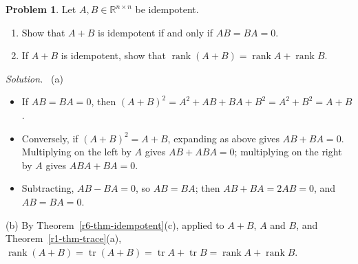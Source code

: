 \documentclass[12pt]{article}
\newcommand{\R}{\mathbb R}
\DeclareMathOperator{\tr}{tr}
\DeclareMathOperator{\rank}{rank}
\theoremstyle{definition}
\newtheorem{problem}{Problem}
\newenvironment{solution}{\par\noindent\textit{Solution.}\ }{\par\smallskip}
\begin{document}
\begin{problem}\label{r6-ex-idempotent-sum}
Let \(A,B\in\R^{n\times n}\) be idempotent.
\begin{enumerate}
\item Show that \(A+B\) is idempotent if and only if \(AB=BA=0\).
\item If \(A+B\) is idempotent, show that \(\rank(A+B)=\rank A+\rank B\).
\end{enumerate}
\end{problem}
\begin{solution}
(a)
\begin{itemize}
\item If \(AB=BA=0\), then \((A+B)^2=A^2+AB+BA+B^2=A^2+B^2=A+B\).
\item Conversely, if \((A+B)^2=A+B\), expanding as above gives \(AB+BA=0\). Multiplying on the left by \(A\) gives
\(AB+ABA=0\); multiplying on the right by \(A\) gives \(ABA+BA=0\).
\item Subtracting, \(AB-BA=0\), so \(AB=BA\); then \(AB+BA=2AB=0\), and \(AB=BA=0\).
\end{itemize}
(b) By Theorem~\ref{r6-thm-idempotent}(c), applied to \(A+B\), \(A\) and \(B\), and
Theorem~\ref{r1-thm-trace}(a), \(\rank(A+B)=\tr(A+B)=\tr A+\tr B=\rank A+\rank B\).
\end{solution}
\end{document}

